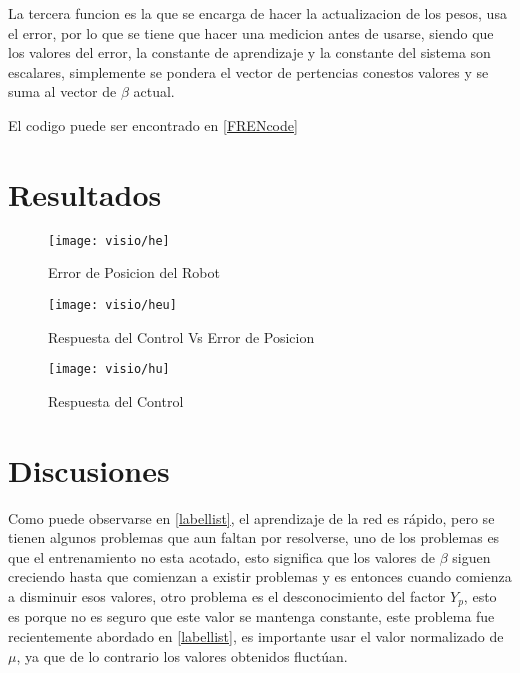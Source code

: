    La tercera funcion es la que se encarga de hacer la actualizacion de los pesos, usa el error, por lo que se tiene que hacer una medicion antes de usarse, siendo que los valores del error, la constante de aprendizaje y la constante del sistema son escalares, simplemente se pondera el vector de pertencias conestos valores y se suma al vector de $\beta$ actual.
   
   El codigo puede ser encontrado en \cref{FRENcode}  
   
   \section{Resultados}
   
    
\begin{figure}[h]
	\centering
	\texttt{[image: visio/he]}
	\caption{Error de Posicion del Robot}
	\label{fig:he}
\end{figure}
\begin{figure}[h]
	\centering
		\texttt{[image: visio/heu]}
	\caption{Respuesta del Control Vs Error de Posicion}
	\label{fig:heu}
\end{figure}
\begin{figure}[h]
	\centering
	\texttt{[image: visio/hu]}
	\caption{Respuesta del Control}
	\label{fig:hu}
\end{figure}
    
    
    \section{Discusiones}
    
    Como puede observarse en \ref{labellist}, el aprendizaje de la red es rápido, pero se tienen algunos problemas que aun faltan por resolverse, uno de los problemas es que el entrenamiento no esta acotado, esto significa que los valores de $\beta$ siguen creciendo hasta que comienzan a existir problemas y es entonces cuando comienza a disminuir esos valores, otro problema es el desconocimiento del factor $Y_p$, esto es porque no es seguro que este valor se mantenga constante, este problema fue recientemente abordado en \cref{labellist}, es importante usar el valor normalizado de $\mu$, ya que de lo contrario los valores obtenidos fluctúan.
    